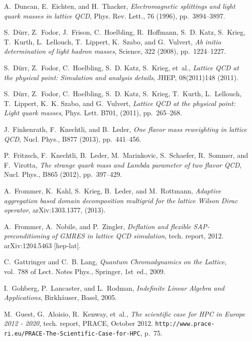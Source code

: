 \documentclass{siamltex}
\begin{document}
\begin{thebibliography}{10}
  {\sc A.~Duncan, E.~Eichten, and H.~Thacker}, {\em Electromagnetic splittings
      and light quark masses in lattice {QCD}}, Phys. Rev. Lett., 76 (1996),
  pp.~3894--3897.

  {\sc S.~D{\"{u}}rr, Z.~Fodor, J.~Frison, C.~Hoelbling, R.~Hoffmann, S.~D. Katz,
  S.~Krieg, T.~Kurth, L.~Lellouch, T.~Lippert, K.~Szabo, and G.~Vulvert}, {\em
      Ab initio determination of light hadron masses}, Science, 322 (2008),
  pp.~1224--1227.

  {\sc S.~D{\"{u}}rr, Z.~Fodor, C.~Hoelbling, S.~D. Katz, S.~Krieg, et~al.}, {\em
      Lattice {QCD} at the physical point: Simulation and analysis details}, JHEP,
  08(2011)148 (2011).

  {\sc S.~D{\"{u}}rr, Z.~Fodor, C.~Hoelbling, S.~D. Katz, S.~Krieg, T.~Kurth,
  L.~Lellouch, T.~Lippert, K.~K. Szabo, and G.~Vulvert}, {\em Lattice {QCD} at
      the physical point: Light quark masses}, Phys. Lett. B701,  (2011),
  pp.~265--268.

  {\sc J.~Finkenrath, F.~Knechtli, and B.~Leder}, {\em One flavor mass
      reweighting in lattice {QCD}}, Nucl. Phys., B877 (2013), pp.~441--456.

  {\sc P.~Fritzsch, F.~Knechtli, B.~Leder, M.~Marinkovic, S.~Schaefer, R.~Sommer,
    and F.~Virotta}, {\em The strange quark mass and {Lambda} parameter of two
      flavor {QCD}}, Nucl. Phys., B865 (2012), pp.~397--429.

  {\sc A.~Frommer, K.~Kahl, S.~Krieg, B.~Leder, and M.~Rottmann}, {\em Adaptive
  aggregation based domain decomposition multigrid for the lattice {W}ilson
  {D}irac operator}, arXiv:1303.1377,  (2013).

  {\sc A.~Frommer, A.~Nobile, and P.~Zingler}, {\em Deflation and flexible
        {SAP}-preconditioning of {GMRES} in lattice {QCD} simulation}, tech. report,
  2012.
  \newblock arXiv:1204.5463 [hep-lat].

  {\sc C.~Gattringer and C.~B. Lang}, {\em Quantum Chromodynamics on the
      Lattice}, vol.~788 of Lect. Notes Phys., Springer, 1st~ed., 2009.

  {\sc I.~Gohberg, P.~Lancaster, and L.~Rodman}, {\em Indefinite Linear Algebra
      and Applications}, Birkh{\"{a}}user, Basel, 2005.

  {\sc M.~Guest, G.~Aloisio, R.~Kenway, et~al.}, {\em The scientific case for
        {HPC} in {E}urope 2012 - 2020}, tech. report, PRACE, October 2012.
  \newblock \texttt{http://www.prace-ri.eu/PRACE-The-Scientific-Case-for-HPC},
  p.~75.


\end{thebibliography}
\end{document}
